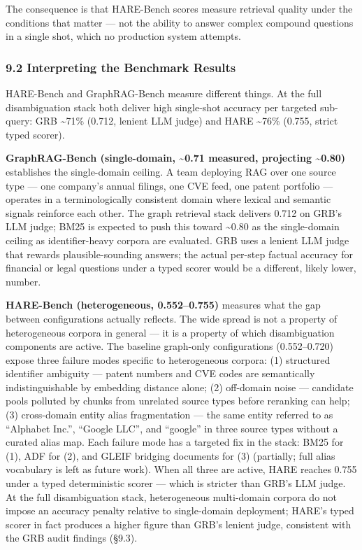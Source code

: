 \documentclass[
]{article}
\begin{document}
The consequence is that HARE-Bench scores measure retrieval quality
under the conditions that matter --- not the ability to answer complex
compound questions in a single shot, which no production system
attempts.

\subsubsection{9.2 Interpreting the Benchmark
Results}\label{interpreting-the-benchmark-results}

HARE-Bench and GraphRAG-Bench measure different things. At the full
disambiguation stack both deliver high single-shot accuracy per targeted
sub-query: GRB \textasciitilde71\% (0.712, lenient LLM judge) and HARE
\textasciitilde76\% (0.755, strict typed scorer).

\textbf{GraphRAG-Bench (single-domain, \textasciitilde0.71 measured,
projecting \textasciitilde0.80)} establishes the single-domain ceiling.
A team deploying RAG over one source type --- one company's annual
filings, one CVE feed, one patent portfolio --- operates in a
terminologically consistent domain where lexical and semantic signals
reinforce each other. The graph retrieval stack delivers 0.712 on GRB's
LLM judge; BM25 is expected to push this toward \textasciitilde0.80 as
the single-domain ceiling as identifier-heavy corpora are evaluated. GRB
uses a lenient LLM judge that rewards plausible-sounding answers; the
actual per-step factual accuracy for financial or legal questions under
a typed scorer would be a different, likely lower, number.

\textbf{HARE-Bench (heterogeneous, 0.552--0.755)} measures what the gap
between configurations actually reflects. The wide spread is not a
property of heterogeneous corpora in general --- it is a property of
which disambiguation components are active. The baseline graph-only
configurations (0.552--0.720) expose three failure modes specific to
heterogeneous corpora: (1) structured identifier ambiguity --- patent
numbers and CVE codes are semantically indistinguishable by embedding
distance alone; (2) off-domain noise --- candidate pools polluted by
chunks from unrelated source types before reranking can help; (3)
cross-domain entity alias fragmentation --- the same entity referred to
as ``Alphabet Inc.'', ``Google LLC'', and ``google'' in three source
types without a curated alias map. Each failure mode has a targeted fix
in the stack: BM25 for (1), ADF for (2), and GLEIF bridging documents
for (3) (partially; full alias vocabulary is left as future work). When
all three are active, HARE reaches 0.755 under a typed deterministic
scorer --- which is stricter than GRB's LLM judge. At the full
disambiguation stack, heterogeneous multi-domain corpora do not impose
an accuracy penalty relative to single-domain deployment; HARE's typed
scorer in fact produces a higher figure than GRB's lenient judge,
consistent with the GRB audit findings (§9.3).
\end{document}
